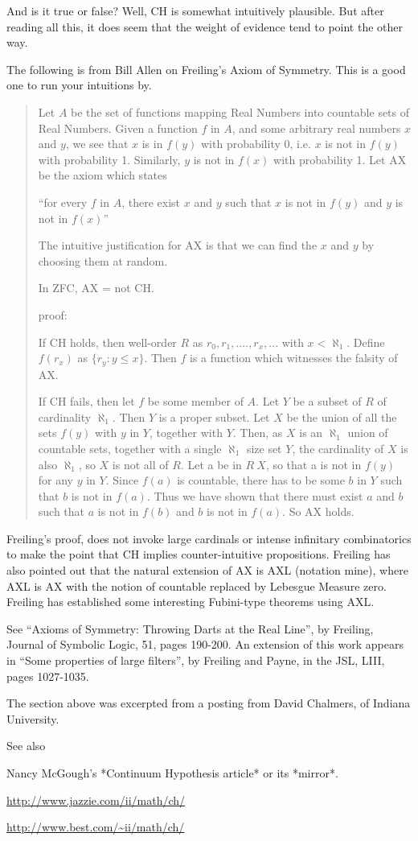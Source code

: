 And is it true or false?  Well, CH is somewhat intuitively plausible.
But after reading all this, it does seem that the weight of evidence
tend to point the other way.

The following is from Bill Allen on Freiling's Axiom of Symmetry.  This
is a good one to run your intuitions by.

\begin{quote}
  Let $A$ be the set of functions mapping Real Numbers into countable
  sets of Real Numbers.  Given a function $f$ in $A$, and some arbitrary
  real numbers $x$ and $y$, we see that $x$ is in $f(y)$ with
  probability 0, i.e. $x$ is not in $f(y)$ with probability 1.
  Similarly, $y$ is not in $f(x)$ with probability 1.  Let AX be the
  axiom which states

  ``for every $f$ in $A$, there exist $x$ and $y$ such that $x$ is not
  in $f(y)$ and $y$ is not in $f(x)$''

  The intuitive justification for AX is that we can find the $x$ and $y$
  by choosing them at random.

  In ZFC, AX = not CH.

  proof:

  If CH holds, then well-order $R$ as $r_0, r_1, .... , r_x, ...$ with
  $x < \aleph_1$.  Define $f(r_x)$ as $\{r_y : y \leq x\}$.  Then $f$ is
  a function which witnesses the falsity of AX.

  If CH fails, then let $f$ be some member of $A$.  Let $Y$ be a subset
  of $R$ of cardinality $\aleph_1$.  Then $Y$ is a proper subset.  Let
  $X$ be the union of all the sets $f(y)$ with $y$ in $Y$, together with
  $Y$.  Then, as $X$ is an $\aleph_1$ union of countable sets, together
  with a single $\aleph_1$ size set $Y$, the cardinality of $X$ is also
  $\aleph_1$, so $X$ is not all of $R$.  Let a be in $R \ X$, so that a
  is not in $f(y)$ for any $y$ in $Y$.  Since $f(a)$ is countable, there
  has to be some $b$ in $Y$ such that $b$ is not in $f(a)$.  Thus we
  have shown that there must exist $a$ and $b$ such that $a$ is not in
  $f(b)$ and $b$ is not in $f(a)$.  So AX holds.
\end{quote}

Freiling's proof, does not invoke large cardinals or intense infinitary
combinatorics to make the point that CH implies counter-intuitive
propositions.  Freiling has also pointed out that the natural extension
of AX is AXL (notation mine), where AXL is AX with the notion of
countable replaced by Lebesgue Measure zero.  Freiling has established
some interesting Fubini-type theorems using AXL.

See ``Axioms of Symmetry: Throwing Darts at the Real Line'', by
Freiling, Journal of Symbolic Logic, 51, pages 190-200.  An extension of
this work appears in ``Some properties of large filters'', by Freiling
and Payne, in the JSL, LIII, pages 1027-1035.

The section above was excerpted from a posting from David Chalmers, of
Indiana University.

See also

Nancy McGough's *Continuum Hypothesis article* or its *mirror*.

\url{http://www.jazzie.com/ii/math/ch/}

\url{http://www.best.com/~ii/math/ch/}
